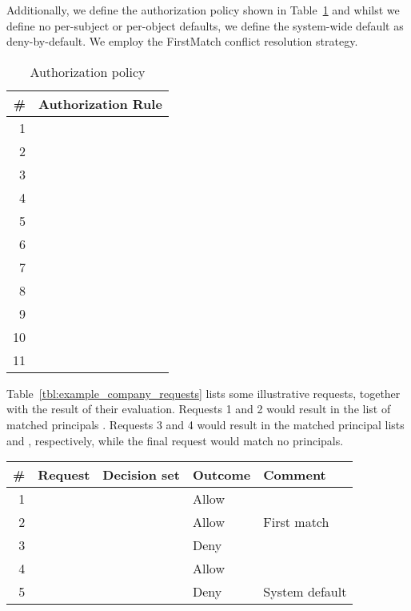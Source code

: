 \documentclass{article}
\begin{document}
Additionally, we define the authorization policy shown in Table~\ref{tbl:example_company_authorization_policy} and whilst we define no per-subject or per-object defaults, we define the system-wide default as \textsf{deny-by-default}. We employ the \textsf{FirstMatch} conflict resolution strategy.

\begin{table}[!ht]\centering
  {\renewcommand{\arraystretch}{1.25}
  \begin{tabular}{|r|l|}
    \hline
        \bf \# & \bf Authorization Rule \\
    \hline
    \hline
        1 &  \\
        2 &  \\
        3 &  \\
        4 &  \\
        5 &  \\
        6 &  \\
        7 &  \\
        8 &  \\
        9 &  \\
        10 &  \\
        11 &  \\
    \hline
  \end{tabular}}
\caption{Authorization policy}\label{tbl:example_company_authorization_policy}
\end{table}

Table~\ref{tbl:example_company_requests} lists some illustrative requests, together with the result of their evaluation.
Requests 1 and 2 would result in the list of matched principals .
Requests 3 and 4 would result in the matched principal lists  and , respectively, while the final request would match no principals.

\begin{table*}[!ht]\centering
  {\renewcommand{\arraystretch}{1.25}
  \begin{tabular}{|r|l|l|l|l|}
    \hline
        \bf \# & \bf Request & \bf Decision set & \bf Outcome & \bf Comment \\
    \hline
    \hline
        1 &  &  & Allow & \\
        2 &  &  & Allow & First match \\
        3 &  &  & Deny & \\
        4 &  &  & Allow & \\
        5 &  &  & Deny & System default \\
    \hline
  \end{tabular}}
\caption{Sample requests}\label{tbl:example_company_requests}
\end{table*}
\end{document}
